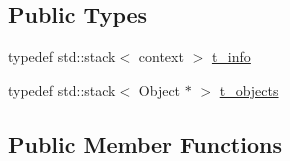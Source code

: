 \subsection*{Public Types}
\begin{DoxyCompactItemize}
\item 
typedef std\+::stack$<$ context $>$ \hyperlink{classxtd_1_1servers_1_1app_1_1HtmlOArchive_aedb461454d0c255709664fcccc379cf5}{t\+\_\+info}
\item 
typedef std\+::stack$<$ Object $\ast$ $>$ \hyperlink{classxtd_1_1servers_1_1app_1_1HtmlOArchive_a0409a4336819121b7ec0d402ffca9cdf}{t\+\_\+objects}
\end{DoxyCompactItemize}
\subsection*{Public Member Functions}
